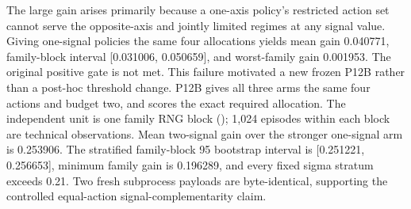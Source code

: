 \markdownRendererInterblockSeparator
{}The large gain arises primarily because a one-axis policy's restricted action set cannot serve the opposite-axis and jointly limited regimes at any signal value.\markdownRendererInterblockSeparator
{}Giving one-signal policies the same four allocations yields mean gain 0.040771, family-block interval [0.031006, 0.050659], and worst-family gain 0.001953. The original positive gate is not met. This failure motivated a new frozen P12B rather than a post-hoc threshold change.\markdownRendererInterblockSeparator
{}
\markdownRendererSectionEnd \markdownRendererSectionBegin
{}\markdownRendererInterblockSeparator
{}P12B gives all three arms the same four actions and budget two, and scores the exact required allocation. The independent unit is one family RNG block (); 1,024 episodes within each block are technical observations. Mean two-signal gain over the stronger one-signal arm is 0.253906. The stratified family-block 95\markdownRendererPercentSign{} bootstrap interval is [0.251221, 0.256653], minimum family gain is 0.196289, and every fixed sigma stratum exceeds 0.21. Two fresh subprocess payloads are byte-identical, supporting the controlled equal-action signal-complementarity claim.
\markdownRendererSectionEnd 
\markdownRendererSectionEnd \markdownRendererDocumentEnd